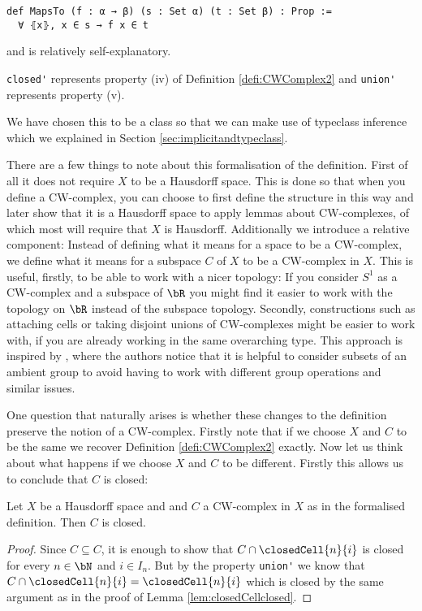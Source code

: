 \begin{lstlisting}
def MapsTo (f : α → β) (s : Set α) (t : Set β) : Prop :=
  ∀ ⦃x⦄, x ∈ s → f x ∈ t
\end{lstlisting}

and is relatively self-explanatory.  

\lstinline{closed'} represents property (iv) of Definition \ref{defi:CWComplex2} and \lstinline{union'} represents property (v).

\medskip

We have chosen this to be a class so that we can make use of typeclass inference which we explained in Section \ref{sec:implicitandtypeclass}.

There are a few things to note about this formalisation of the definition.
First of all it does not require $X$ to be a Hausdorff space.
This is done so that when you define a CW-complex, you can choose to first define the structure in this way and later show that it is a Hausdorff space to apply lemmas about CW-complexes, of which most will require that $X$ is Hausdorff.
Additionally we introduce a relative component:
Instead of defining what it means for a space to be a CW-complex, we define what it means for a subspace $C$ of $X$ to be a CW-complex in $X$.
This is useful, firstly, to be able to work with a nicer topology:
If you consider $S^1$ as a CW-complex and a subspace of $\bR$ you might find it easier to work with the topology on $\bR$ instead of the subspace topology.
Secondly, constructions such as attaching cells or taking disjoint unions of CW-complexes might be easier to work with, if you are already working in the same overarching type.
This approach is inspired by \cite{Gonthier2013}, where the authors notice that it is helpful to consider subsets of an ambient group to avoid having to work with different group operations and similar issues.

One question that naturally arises is whether these changes to the definition preserve the notion of a CW-complex.
Firstly note that if we choose $X$ and $C$ to be the same we recover Definition \ref{defi:CWComplex2} exactly.
Now let us think about what happens if we choose $X$ and $C$ to be different.
Firstly this allows us to conclude that $C$ is closed:

\begin{lem} \label{lem:Cclosed}
  Let $X$ be a Hausdorff space and and $C$ a CW-complex in $X$ as in the formalised definition.
  Then $C$ is closed.
  \href{https://github.com/scholzhannah/CWComplexes/blob/7be4872a05b534011cc969eb5b80a4b7f0bf57e2/CWcomplexes/Definition.lean#L234-L238}{\faExternalLink}
\end{lem}
\begin{proof}
  Since $C \subseteq C$, it is enough to show that $C \cap \closedCell{n}{i}$ is closed for every $n \in \bN$ and $i \in I_n$.
  But by the property \lstinline{union'} we know that $C \cap \closedCell{n}{i} = \closedCell{n}{i}$ which is closed by the same argument as in the proof of Lemma \ref{lem:closedCellclosed}.
\end{proof}

